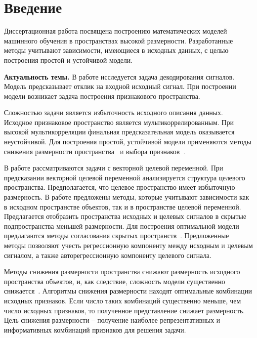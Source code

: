 \chapter*{Введение}

Диссертационная работа посвящена построению математических моделей машинного обучения в пространствах высокой размерности.
Разработанные методы учитывают зависимости, имеющиеся в исходных данных, с целью построения простой и устойчивой модели.

\textbf{Актуальность темы.} 
В работе исследуется задача декодирования сигналов. 
Модель предсказывает отклик на входной исходный сигнал.
При построении модели возникает задача построения признакового пространства. 

Сложностью задачи является избыточность исходного описания данных. 
Исходное признаковое пространство является мультикоррелированным.
При высокой мультикорреляции финальная предсказательная модель оказывается неустойчивой.
Для построения простой, устойчивой модели применяются методы снижения размерности пространства~\cite{motrenko2018multi,chun2010sparse,mehmood2012review}  и выбора признаков~\cite{katrutsa2017comprehensive,li2017feature}.

В работе рассматриваются задачи с векторной целевой переменной. 
При предсказании векторной целевой переменной анализируется структура целевого пространства.
Предполагается, что целевое пространство имеет избыточную размерность.
В работе предложены методы, которые учитывают зависимости как в исходном пространстве объектов, так и в пространстве целевой переменной.
Предлагается отобразить пространства исходных и целевых сигналов в скрытые подпространства меньшей размерности.
Для построения оптимальной модели предлагаются методы согласования скрытых пространств~\cite{wold1975path,rosipal2005overview,eliseyev2017recursive}.
Предложенные методы позволяют учесть регрессионную компоненту между исходным и целевым сигналом, а также авторегрессионную компоненту целевого сигнала.

Методы снижения размерности пространства снижают размерность исходного пространства объектов, и, как следствие, сложность модели существенно снижается~\cite{tipping1999probabilisticpca,wold1975path,hotelling1992relations}. 
Алгоритмы снижения размерности находят оптимальные комбинации исходных признаков. 
Если число таких комбинаций существенно меньше, чем число исходных признаков, то полученное представление снижает размерность.
Цель снижения размерности -- получение наиболее репрезентативных и информативных комбинаций признаков для решения задачи.

